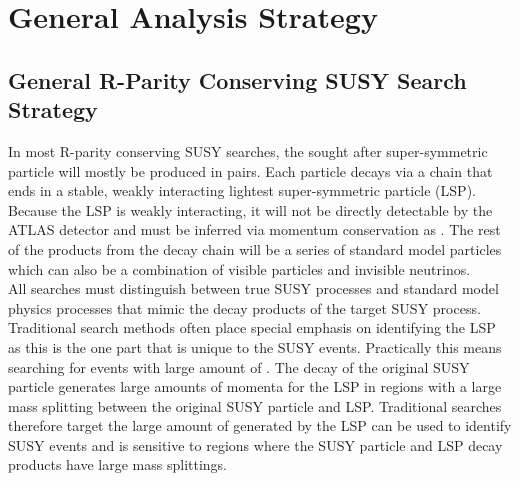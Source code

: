 \chapter{General Analysis Strategy}
\label{chap:AnaStrategy}
\section{General R-Parity Conserving SUSY Search Strategy}
\indent In most R-parity conserving SUSY searches, the sought after super-symmetric particle will mostly be produced in pairs.  Each particle decays via a chain that ends in a stable, weakly interacting lightest super-symmetric particle (LSP).  Because the LSP is weakly interacting, it will not be directly detectable by the ATLAS detector and must be inferred via momentum conservation as \MET.  The rest of the products from the decay chain will be a series of standard model particles which can also be a combination of visible particles and invisible neutrinos.  ~\\
\indent All searches must distinguish between true SUSY processes and standard model physics processes that mimic the decay products of the target SUSY process.  Traditional search methods often place special emphasis on identifying the LSP as this is the one part that is unique to the SUSY events.  Practically this means searching for events with large amount of \MET.  The decay of the original SUSY particle generates large amounts of momenta for the LSP in regions with a large mass splitting between the original SUSY particle and LSP.  Traditional searches therefore target the large amount of \MET generated by the LSP can be used to identify SUSY events and is sensitive to regions where the SUSY particle and LSP decay products have large mass splittings. ~\\
